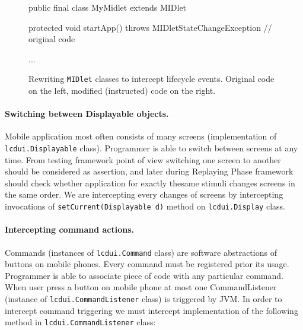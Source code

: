 \documentclass[a4paper,10pt,oneside,final]{dweiss-technote}
\begin{document}
\begin{figure}
\begin{minipage}[t]{.49\linewidth}
\begin{codeblock}
public final class MyMidlet extends MIDlet {
    protected void startApp() 
        throws MIDletStateChangeException {
        // original code
    }

    ...
}
\end{codeblock}
\end{minipage}
\hfill
\begin{minipage}[t]{.49\linewidth}
\end{minipage}
\caption{Rewriting \texttt{MIDlet} classes to intercept lifecycle events. Original code on the
left, modified (instructed) code on the right.}\label{fig:midlet-proxy}
\end{figure}

\paragraph*{Switching between Displayable objects.} Mobile application most often consists of many
screens (implementation of \texttt{lcdui.Displayable} class). Programmer is able to switch between
screens at any time. From testing framework point of view switching one screen to another should be
considered as assertion, and later during Replaying Phase framework should check whether application
for exactly thesame stimuli changes screens in the same order. We are intercepting every changes of
screens by intercepting invocations of \texttt{setCurrent(Displayable d)} method on
\texttt{lcdui.Display} class.

\paragraph*{Intercepting command actions.} Commands (instances of \texttt{lcdui.Command} class) are
software abstractions of buttons on mobile phones. Every command must be registered prior its usage.
Programmer is able to associate piece of code with any particular command. When user press a button
on mobile phone at most one CommandListener (instance of \texttt{lcdui.CommandListener} class) is
triggered by JVM. In order to intercept command triggering we must intercept implementation of the
following method in \texttt{lcdui.CommandListener} class:
\end{document}
